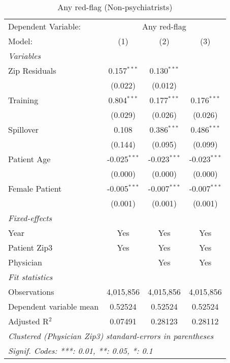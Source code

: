 
\begin{table}[htbp]
   \centering
   \begin{threeparttable}[b]
      \caption{Any red-flag (Non-psychiatrists)}
      \begin{tabular}{lccc}
         \tabularnewline \midrule \midrule
         Dependent Variable: & \multicolumn{3}{c}{Any red-flag}\\
         Model:                  & (1)            & (2)            & (3)\\  
         \midrule
         \emph{Variables}\\
         Zip Residuals           & 0.157$^{***}$  & 0.130$^{***}$  &   \\   
                                 & (0.022)        & (0.012)        &   \\   
         Training                & 0.804$^{***}$  & 0.177$^{***}$  & 0.176$^{***}$\\   
                                 & (0.029)        & (0.026)        & (0.026)\\   
         Spillover               & 0.108          & 0.386$^{***}$  & 0.486$^{***}$\\   
                                 & (0.144)        & (0.095)        & (0.099)\\   
         Patient Age             & -0.025$^{***}$ & -0.023$^{***}$ & -0.023$^{***}$\\   
                                 & (0.000)        & (0.000)        & (0.000)\\   
         Female Patient          & -0.005$^{***}$ & -0.007$^{***}$ & -0.007$^{***}$\\   
                                 & (0.001)        & (0.001)        & (0.001)\\   
         \midrule
         \emph{Fixed-effects}\\
         Year                    & Yes            & Yes            & Yes\\  
         Patient Zip3            & Yes            & Yes            & Yes\\  
         Physician               &                & Yes            & Yes\\  
         \midrule
         \emph{Fit statistics}\\
         Observations            & 4,015,856      & 4,015,856      & 4,015,856\\  
         Dependent variable mean & 0.52524        & 0.52524        & 0.52524\\  
         Adjusted R$^2$          & 0.07491        & 0.28123        & 0.28112\\  
         \midrule \midrule
         \multicolumn{4}{l}{\emph{Clustered (Physician Zip3) standard-errors in parentheses}}\\
         \multicolumn{4}{l}{\emph{Signif. Codes: ***: 0.01, **: 0.05, *: 0.1}}\\
      \end{tabular}
   \end{threeparttable}
\end{table}


